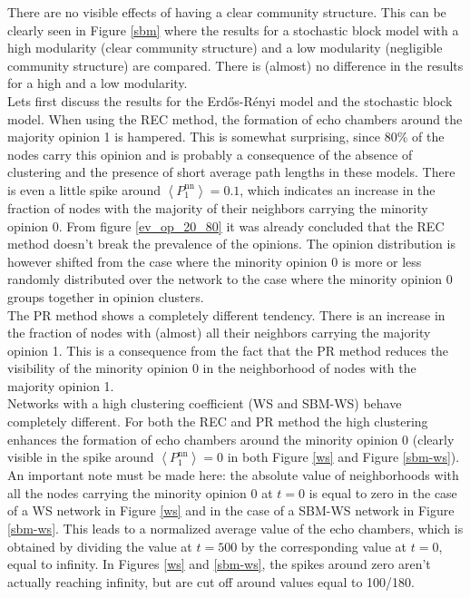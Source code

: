 \documentclass[11 pt , letterpaper , twoside , openright]{book}
\begin{document}
There are no visible effects of having a clear community structure. This can be clearly seen in Figure \ref{sbm} where the results for a stochastic block model with a high modularity (clear community structure) and a low modularity (negligible community structure) are compared. There is (almost) no difference in the results for a high and a low modularity.\\
\newline
Lets first discuss the results for the Erd\H{o}s-R\'{e}nyi model and the stochastic block model. When using the REC method, the formation of echo chambers around the majority opinion 1 is hampered. This is somewhat surprising, since $80\%$ of the nodes carry this opinion and is probably a consequence of the absence of clustering and the presence of short average path lengths in these models. There is even a little spike around $\left<P_1^{\text{nn}}\right> = 0.1$, which indicates an increase in the fraction of nodes with the majority of their neighbors carrying the minority opinion 0. From figure \ref{ev_op_20_80} it was already concluded that the REC method doesn't break the prevalence of the opinions. The opinion distribution is however shifted from the case where the minority opinion 0 is more or less randomly distributed over the network to the case where the minority opinion 0 groups together in opinion clusters. \\
The PR method shows a completely different tendency. There is an increase in the fraction of nodes with (almost) all their neighbors carrying the majority opinion 1. This is a consequence from the fact that the PR method reduces the visibility of the minority opinion 0 in the neighborhood of nodes with the majority opinion 1. \\
\newline
Networks with a high clustering coefficient (WS and SBM-WS) behave completely different. For both the REC and PR method the high clustering enhances the formation of echo chambers around the minority opinion 0 (clearly visible in the spike around $\left<P_1^{\text{nn}}\right> = 0$ in both Figure \ref{ws} and Figure \ref{sbm-ws}). An important note must be made here: the absolute value of neighborhoods with all the nodes carrying the minority opinion 0 at $t=0$ is equal to zero in the case of a WS network in Figure \ref{ws} and in the case of a SBM-WS network in Figure \ref{sbm-ws}. This leads to a normalized average value of the echo chambers, which is obtained by dividing the value at $t=500$ by the corresponding value at $t=0$, equal to infinity. In Figures \ref{ws} and \ref{sbm-ws}, the spikes around zero aren't actually reaching infinity, but are cut off around values equal to 100/180.\\
\end{document}
